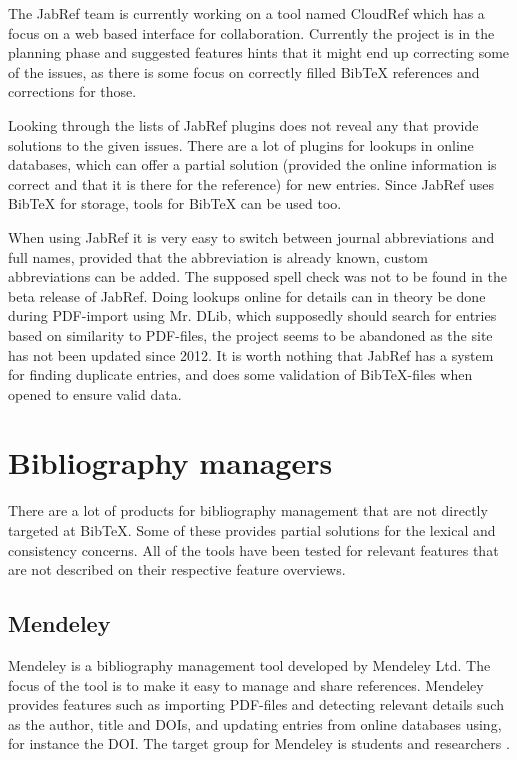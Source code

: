 The JabRef team is currently working on a tool named CloudRef which
has a focus on a web based interface for collaboration.  Currently the
project is in the planning phase and suggested features hints that it
might end up correcting some of the issues, as there is some focus on
correctly filled Bib{\TeX} references and corrections for those.

Looking through the lists of JabRef plugins does not reveal any that provide
solutions to the given issues.  There are a lot of plugins for lookups
in online databases, which can offer a partial solution (provided the
online information is correct and that it is there for the reference)
for new entries\cite{jabref_resources}.  Since JabRef uses Bib{\TeX}
for storage, tools for Bib{\TeX} can be used too.

When using JabRef it is very easy to switch between journal
abbreviations and full names, provided that the abbreviation is
already known, custom abbreviations can be
added\cite{jabref_abbreviations}.  The supposed spell check was not to
be found in the beta release of JabRef.  Doing lookups online for
details can in theory be done during PDF-import using Mr. DLib, which
supposedly should search for entries based on similarity to PDF-files,
the project seems to be abandoned as the site has not been updated
since 2012\cite{jabref_mrdlib,jabref_mrdlib_notice}.  It is worth
nothing that JabRef has a system for finding duplicate entries, and
does some validation of Bib{\TeX}-files when opened to ensure valid
data.

\section{Bibliography managers}
There are a lot of products for bibliography management that are not
directly targeted at Bib{\TeX}.  Some of these provides partial
solutions for the lexical and consistency concerns.  All of the tools
have been tested for relevant features that are not described on their
respective feature overviews.

\subsection{Mendeley}
Mendeley is a bibliography management tool developed by Mendeley Ltd.
The focus of the tool is to make it easy to manage and share
references.  Mendeley provides features such as importing PDF-files
and detecting relevant details such as the author, title and DOIs, and
updating entries from online databases using, for instance the DOI.
The target group for Mendeley is students and researchers
\cite{mendeley_features}.

